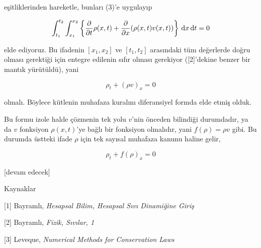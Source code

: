 \documentclass[12pt,fleqn]{article}\usepackage{../../common}
\begin{document}
eşitliklerinden hareketle, bunları (3)'e uygulayıp

$$
\int _{t_1}^{t_2} \int _{x_1}^{x_2}  \left\{
\frac{\partial }{\partial t} \rho(x,t)  +
\frac{\partial }{\partial x} (\rho(x,t)v(x,t))
\right\} \,\mathrm{d} x \,\mathrm{d} t = 0
$$

elde ediyoruz. Bu ifadenin $[x_1,x_2]$ ve $[t_1,t_2]$ arasındaki tüm değerlerde
doğru olması gerektiği için entegre edilenin sıfır olması gerekiyor ([2]'dekine
benzer bir mantık yürütüldü), yani

$$
\rho_t + (\rho v)_x = 0
$$

olmalı. Böylece kütlenin muhafaza kuralını diferansiyel formda elde etmiş olduk.

Bu formu izole halde çözmenin tek yolu $v$'nin önceden bilindiği durumdadır, ya
da $v$ fonksiyon $\rho(x,t)$'ye bağlı bir fonksiyon olmalıdır, yani
$f(\rho) = \rho v$ gibi. Bu durumda üstteki ifade $\rho$ için tek sayısal
muhafaza kanunu haline gelir,

$$
\rho_t + f(\rho)_x = 0
$$











[devam edecek]

Kaynaklar

[1] Bayramlı, {\em Hesapsal Bilim, Hesapsal Sıvı Dinamiğine Giriş}

[2] Bayramlı, {\em Fizik, Sıvılar, 1}

[3] Leveque, {\em Numerical Methods for Conservation Laws}
\end{document}
